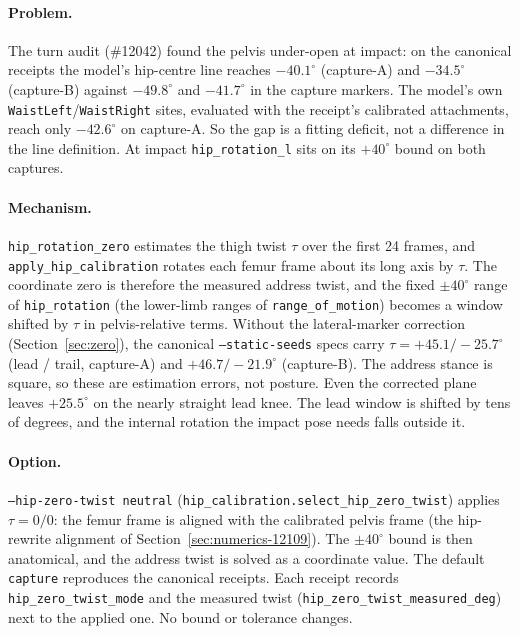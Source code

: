 \documentclass[11pt]{article}
\begin{document}
\paragraph{Problem.} The turn audit (\#12042) found the pelvis under-open at
impact: on the canonical receipts the model's hip-centre line reaches
$-40.1^\circ$ (capture-A) and $-34.5^\circ$ (capture-B) against
$-49.8^\circ$ and $-41.7^\circ$ in the capture markers. The model's own
\texttt{WaistLeft}/\texttt{WaistRight} sites, evaluated with the receipt's
calibrated attachments, reach only $-42.6^\circ$ on capture-A. So the gap is a
fitting deficit, not a difference in the line definition. At impact
\texttt{hip\_rotation\_l} sits on its $+40^\circ$ bound on both captures.

\paragraph{Mechanism.} \texttt{hip\_rotation\_zero} estimates the thigh twist
$\tau$ over the first 24 frames, and \texttt{apply\_hip\_calibration} rotates
each femur frame about its long axis by $\tau$. The coordinate zero is
therefore the measured address twist, and the fixed $\pm40^\circ$ range of
\texttt{hip\_rotation} (the lower-limb ranges of
\texttt{range\_of\_motion}) becomes a window shifted by $\tau$ in
pelvis-relative terms. Without the
lateral-marker correction (Section~\ref{sec:zero}), the canonical
\texttt{--static-seeds} specs carry $\tau = +45.1 / -25.7^\circ$ (lead /
trail, capture-A) and $+46.7 / -21.9^\circ$ (capture-B). The address stance
is square, so these are estimation errors, not posture. Even the corrected
plane leaves $+25.5^\circ$ on the nearly straight lead knee. The lead window
is shifted by tens of degrees, and the internal rotation the impact pose needs
falls outside it.

\paragraph{Option.} \texttt{--hip-zero-twist neutral}
(\texttt{hip\_calibration.select\_hip\_zero\_twist}) applies $\tau = 0 / 0$:
the femur frame is aligned with the calibrated pelvis frame (the hip-rewrite
alignment of Section~\ref{sec:numerics-12109}). The $\pm40^\circ$ bound is
then anatomical, and the address twist is solved as a coordinate value. The
default \texttt{capture} reproduces the canonical receipts. Each receipt
records \texttt{hip\_zero\_twist\_mode} and the measured twist
(\texttt{hip\_zero\_twist\_measured\_deg}) next to the applied one. No bound
or tolerance changes.
\end{document}
